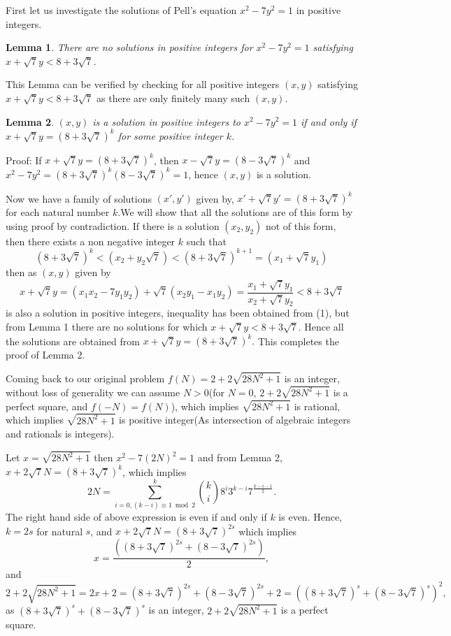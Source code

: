 \documentclass{article}
\begin{document}
	
First let us investigate the solutions of Pell's equation $x^2-7y^2=1$ in positive integers.

\newtheorem{Claim1}{Lemma}
\newtheorem{Claim2}[Claim1]{Lemma}

\begin{Claim1}
	There are no solutions in positive integers for $x^2-7y^2=1$ satisfying $x+\sqrt{7}y<8+3\sqrt{7}$.
\end{Claim1}
This Lemma can be verified by checking for all positive integers $(x,y)$ satisfying $x+\sqrt{7}y<8+3\sqrt{7}$ as there are only finitely many such $(x,y)$.

\begin{Claim2}
	$(x,y)$ is a solution in positive integers to $x^2-7y^2=1$ if and only if $x+\sqrt{7}y = (8+3\sqrt{7})^k$ for some positive integer $k$.
\end{Claim2}
Proof: If $x+\sqrt{7}y = (8+3\sqrt{7})^k$, then $x-\sqrt{7}y = (8-3\sqrt{7})^k$ and $x^2-7y^2=(8+3\sqrt{7})^k(8-3\sqrt{7})^k=1$, hence $(x,y)$ is a solution.

Now we have a family of solutions $(x',y')$ given by, $x'+\sqrt{7}y' = (8+3\sqrt{7})^k$ for each natural number $k$.We will show that all the solutions are of this form by using proof by contradiction. If there is a solution $(x_2,y_2)$ not of this form, then there exists a non negative integer $k$ such that \begin{equation}(8+3\sqrt{7})^{k}<(x_2+y_2\sqrt{7})<(8+3\sqrt{7})^{k+1}=(x_1+\sqrt{7}y_1)
\end{equation}   
then as $(x,y)$ given by \[x+\sqrt{7}y = (x_1x_2 -7y_1y_2)+\sqrt{7}(x_2y_1-x_1y_2)   = \frac{x_1+\sqrt{7}y_1}{x_2+\sqrt{7}y_2}<8+3\sqrt{7} \]
is also a solution in positive integers, inequality has been obtained from (1), but from Lemma 1 there are no solutions for which $x+\sqrt{7}y<8+3\sqrt{7}$. Hence all the solutions are obtained from $x+\sqrt{7}y = (8+3\sqrt{7})^{k}.$ This completes the proof of Lemma 2.

Coming back to our original problem $f(N)=2+2\sqrt{28N^2+1}$ is an integer, without loss of generality we can assume $N>0$(for $N=0$, $2+2\sqrt{28N^2+1}$ is a perfect square, and $f(-N)=f(N)$), which implies $\sqrt{28N^2+1}$ is rational, which implies $\sqrt{28N^2+1}$ is positive integer(As intersection of algebraic integers and rationals is integers). 

Let $x=\sqrt{28N^2+1}$ then $x^2-7(2N)^2=1$ and from Lemma 2, $x+2\sqrt{7}N = (8+3\sqrt{7})^k$, which implies 
\[2N = \sum_{i=0,(k-i)\equiv 1 \bmod 2}^{k} {k\choose i}8^i 3^{k-i}7^{\frac{k-i-1}{2}}.\]
The right hand side of above expression is even if and only if $k$ is even. Hence, $k=2s$ for natural $s$, and $x+2\sqrt{7}N = (8+3\sqrt{7})^{2s}$ which implies \[x=\frac{((8+3\sqrt{7})^{2s}+(8-3\sqrt{7})^{2s})}{2},\]
and 
\[2+2\sqrt{28N^2+1} = 2x+2 = (8+3\sqrt{7})^{2s}+(8-3\sqrt{7})^{2s}+2 = ((8+3\sqrt{7})^{s}+(8-3\sqrt{7})^{s})^2,\] as $(8+3\sqrt{7})^{s}+(8-3\sqrt{7})^{s}$ is an integer,  $2+2\sqrt{28N^2+1}$ is a perfect square.
\end{document}
